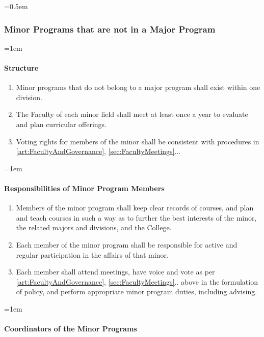 \documentclass{manual}
\let\oldsubsubsection\subsubsection
\renewcommand\subsubsection{\leftskip=0.5em\oldsubsubsection}
\let\oldparagraph\paragraph
\renewcommand\paragraph{\leftskip=1em\oldparagraph}
\newcommand{\itemLevelA}{\alph*.}
\newcommand{\itemRefA}{\alph*}
\begin{document}
\subsubsection{Minor Programs that are not in a Major Program}

\paragraph{Structure}

	\begin{enumerate}[label=\itemLevelA,ref=\itemRefA]
	\item Minor programs that do not belong to a major program shall exist within one division.
	\item The Faculty of each minor field shall meet at least once a year to evaluate and plan curricular offerings. 
	\item Voting rights for members of the minor shall be consistent with procedures in \cref{art:FacultyAndGovernance}, \cref{sec:FacultyMeetings}...
	\end{enumerate}

\paragraph{Responsibilities of Minor Program Members}

	\begin{enumerate}[label=\itemLevelA,ref=\itemRefA]
	\item Members of the minor program shall keep clear records of courses, and plan and teach courses in such a way as to further the best interests of the minor, the related majors and divisions, and the College.
	\item Each member of the minor program shall be responsible for active and regular participation in the affairs of that minor.
	\item Each member shall attend meetings, have voice and vote as per \cref{art:FacultyAndGovernance}, \cref{sec:FacultyMeetings}.. above in the formulation of policy, and perform appropriate minor program duties, including advising.
	\end{enumerate}

\paragraph{Coordinators of the Minor Programs}
\end{document}
